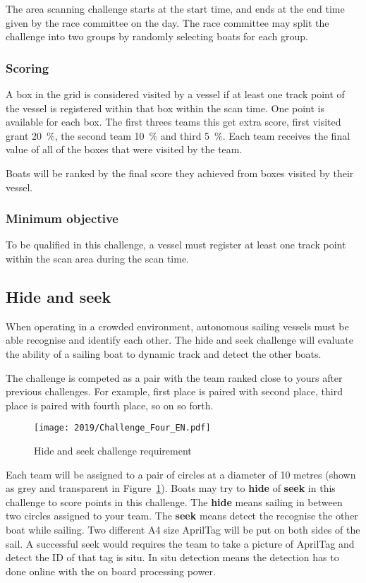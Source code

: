 \documentclass[12pt]{article}
\begin{document}
The area scanning challenge starts at the start time, and ends at the end
time given by the race committee on the day. The race committee may split the
challenge into two groups by randomly selecting boats for each group.

\subsubsection{Scoring}

A box in the grid is considered visited by a vessel if at least one track point
of the vessel is registered within that box within the scan time.
One point is available for each box. The first threes teams this get extra score, 
first visited grant 20~\%, the second team 10~\% and third 5~\%.
Each team receives the final value of all of the boxes that were visited by the
team. 

Boats will be ranked by the final score they achieved from boxes visited by
their vessel.

\subsubsection{Minimum objective}
To be qualified in this challenge, a vessel must register at least one track
point within the scan area during the scan time.

\subsection{Hide and seek}
When operating in a crowded environment, autonomous sailing vessels must be able
recognise and identify each other. 
The hide and seek challenge will evaluate the ability of a sailing boat to dynamic 
track and detect the other boats.

The challenge is competed as a pair with the team ranked close to yours after previous challenges.
For example, first place is paired with second place, third place is paired with fourth place, so on so forth.


  \begin{figure}[H]
    \centering
    \texttt{[image: 2019/Challenge\_Four\_EN.pdf]}
    \caption{Hide and seek challenge requirement}
    \label{fig:hideandseek}
  \end{figure}

Each team will be assigned to a pair of circles at a diameter of 10 metres (shown as grey and transparent in Figure~\ref{fig:hideandseek}).
Boats may try to \textbf{hide} of \textbf{seek} in this challenge to score points in this challenge.
The \textbf{hide} means sailing in between two circles assigned to your team.
The \textbf{seek} means detect the recognise the other boat while sailing.
Two different A4 size AprilTag will be put on both sides of the sail.
A successful seek would requires the team to take a picture of AprilTag and detect the ID of that tag is situ.
In situ detection means the detection has to done online with the on board processing power. 
\end{document}
